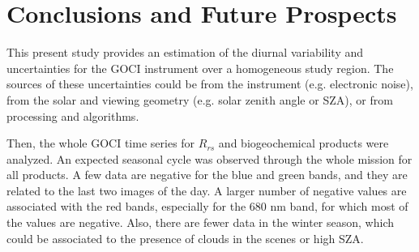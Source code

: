 \documentclass[onecolumn,3p,letterpaper,11pt]{elsarticle}
\begin{document}
\section{Conclusions and Future Prospects} 




This present study provides an estimation of the diurnal variability and uncertainties for the GOCI instrument over a homogeneous study region. 
The sources of these uncertainties could be from the instrument (e.g. electronic noise), from the solar and viewing geometry (e.g. solar zenith angle or SZA), or from processing and algorithms.

Then, the whole GOCI time series for $R_{rs}$ and biogeochemical products were analyzed. 
An expected seasonal cycle was observed through the whole mission for all products. 
A few data are negative for the blue and green bands, and they are related to the last two images of the day.
A larger number of negative values are associated with the red bands, especially for the 680 nm band, for which most of the values are negative.
Also, there are fewer data in the winter season, which could be associated to the presence of clouds in the scenes or high SZA.
\end{document}

